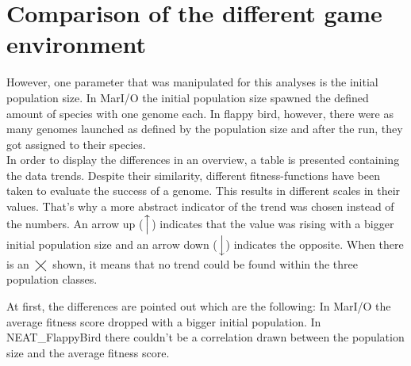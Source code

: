\section{Comparison of the different game environment}
\label{sec:compare:compare}	
	However, one parameter that was manipulated for this analyses is the initial population size. In MarI/O the initial population size spawned the defined amount of species with one genome each. In flappy bird, however, there were as many genomes launched as defined by the population size and after the run, they got assigned to their species.\\
	In order to display the differences in an overview, a table is presented containing the data trends. Despite their similarity, different fitness-functions have been taken to evaluate the success of a genome. This results in different scales in their values. That's why a more abstract indicator of the trend was chosen instead of the numbers. An arrow up ($\Big\uparrow$) indicates that the value was rising with a bigger initial population size and an arrow down ($\Big\downarrow$) indicates the opposite. When there is an $\bigtimes$ shown, it means that no trend could be found within the three population classes.
	\begin{table}[h]
		\centering
		\caption{Date Trend Comparison of different games and their \gls{neat} implementation}
		\label{tab:comp}
	\end{table} 
	At first, the differences are pointed out which are the following: 
	In MarI/O the average fitness score dropped with a bigger initial population. In NEAT\_FlappyBird there couldn't be a correlation drawn between the population size and the average fitness score.\\
